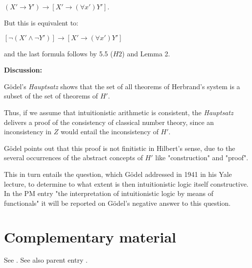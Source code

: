 \documentclass[12pt]{article}
\begin{document}
\begin{enumerate}
\begin{itemize}
\begin{center}
$(X' \rightarrow Y') \rightarrow [X' \rightarrow (\forall x') Y'].$
\end{center}

But this is equivalent to:

\begin{center}
$[\neg (X' \wedge \neg Y')] \rightarrow [X' \rightarrow (\forall x') Y']$
\end{center}
 
and the last formula follows by 5.5 ($H2$) and Lemma 2. 

\end{itemize}

\end{enumerate}

\medskip
\textbf{Discussion:}

G\"{o}del's \emph{Hauptsatz} shows that the set of all theorems of Herbrand's system is a subset of the set of theorems of $H'$.

Thus, if we assume that intuitionistic arithmetic is consistent, the \emph{Hauptsatz} delivers a proof of the consistency of classical number theory, since an inconsistency in $Z$ would entail the inconsistency of $H'$.

G\"{o}del points out that this proof is not finitistic in Hilbert's sense, due to the several occurrences of the abstract concepts of $H'$ like "construction" and "proof".

This in turn entails the question, which G\"{o}del addressed in 1941 in his Yale lecture, to determine to what extent is then intuitionistic logic itself constructive. In the PM entry "the interpretation of intuitionistic logic by means of functionals" it will be reported on G\"{o}del's negative answer to this question.

\section{Complementary material}\normalsize

See . See also parent entry .
\end{document}

